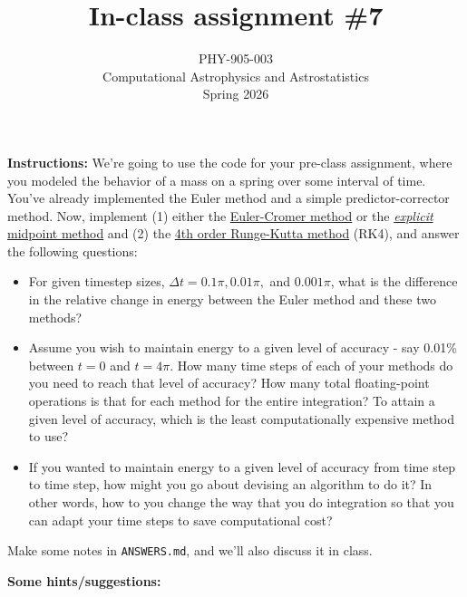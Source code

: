 \documentclass[10pt]{article}
\title{In-class assignment \#7}
\author{PHY-905-003\\Computational Astrophysics and
  Astrostatistics\\Spring 2026}
\date{} %
\begin{document}
 
\maketitle

\vspace{-5mm}

\noindent \textbf{Instructions:}   We're going to use the code for
your pre-class assignment, where you modeled the behavior of a mass on
a spring over some interval of time.  You've already implemented the Euler
method and a simple predictor-corrector method.  Now, implement (1)
either the
  \href{https://en.wikipedia.org/wiki/Semi-implicit_Euler_method}{Euler-Cromer
  method}  or the 
  \href{https://en.wikipedia.org/wiki/Midpoint_method}{\textit{explicit}
    midpoint
    method} and (2) the
  \href{https://en.wikipedia.org/wiki/Runge%E2%80%93Kutta_methods}{4th
                                order Runge-Kutta method} (RK4), and answer
                              the following questions:

\begin{itemize}

\item For given timestep sizes, $\Delta t = 0.1 \pi, 0.01 \pi,$ and
  $0.001 \pi$, what is the
  difference in the relative change in energy between the Euler
  method and these two methods?

\item Assume you wish to maintain energy to a given level of accuracy
  - say 0.01\% between $t=0$ and $t=4\pi$.  How many time steps of
  each of your methods do you need to reach that level of accuracy?
  How many total floating-point operations is that for each method for
  the entire integration?   To attain a given
  level of accuracy, which is the least computationally expensive method to use?

\item If you wanted to maintain energy to a given level of accuracy
  from time step to time step, how might you go about devising an
  algorithm to do it?  In other words, how to you change the way that
  you do integration so that you can adapt your time steps to save
  computational cost?

\end{itemize}

\noindent
Make some notes in \texttt{ANSWERS.md}, and
we'll also discuss it in class.

\vspace{5mm}

\noindent \textbf{Some hints/suggestions:}
\end{document}
